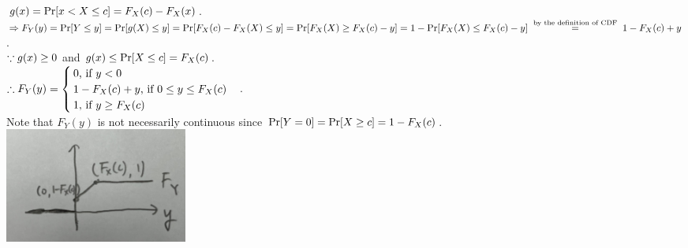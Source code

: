 \begin{pr}
$g(x)=\P[x<X\leq c]=F_X(c)-F_X(x)$.\\
$\then F_Y(y)=\P[Y\leq y]=\P[g(X)\leq y]=\P[F_X(c)-F_X(X)\leq y]=\P[F_X(X)\geq F_X(c)-y]=1-\P[F_X(X)\leq F_X(c)-y]\overtext{ by the definition of CDF }=1-F_X(c)+y$.\\
$\cuz g(x)\geq0$ and $g(x)\leq\P[X\leq c]=F_X(c)$.\\
$\so F_Y(y)=\begin{cases}
0\text{, if }y<0\\
1-F_X(c)+y\text{, if }0\leq y\leq F_X(c)\\
1\text{, if }y\geq F_X(c)\\
\end{cases}$.\\
Note that $F_Y(y)$ is not necessarily continuous since $\P[Y=0]=\P[X\geq c]=1-F_X(c)$.\\
\includegraphics[width=6cm]{6.JPG}
\end{pr}
